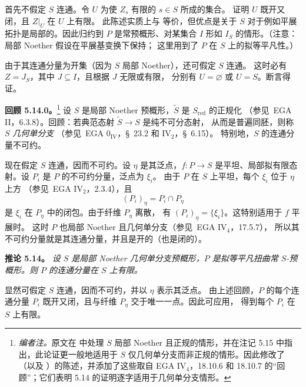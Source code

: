 首先不假定 \(S\) 连通。令 \(U\) 为使 \(Z_s\) 有限的 \(s\in S\) 所成的集合。
证明 \(U\) 既开又闭，且 \(Z|_U\) 在 \(U\) 上有限。
此陈述实质上与  等价，但优点是关于
\(S\) 对于例如平展拓扑是局部的。因此归约到 \(P\) 是常预概形、对某集合
\(I\) 形如 \(I_S\) 的情形。（注意：局部 Noether 假设在平展基变换下保持；
这里用到了 \(P\) 在 \(S\) 上的拟等平凡性。）

由于其连通分量为开集（因为 \(S\) 局部 Noether），还可假定 \(S\) 连通。
这时必有 \(Z=J_S\)，其中 \(J\subseteq I\)，且根据 \(J\) 无限或有限，
分别有 \(U=\varnothing\) 或 \(U=S\)。断言得证。

\par\medskip\noindent
\textbf{回顾 5.14.0。}\footnote{\textit{编者注。}原文在  中处理
\(S\) 局部 Noether 且正规的情形，并在注记 5.15 中指出，此论证更一般地适用于
\(S\) 仅几何单分支而非正规的情形。因此修改了 
（以及 ）的陈述，并添加了这些取自
EGA IV\(_4\)，18.10.6 和 18.10.7 的“回顾”；它们表明 5.14 的证明逐字适用于几何单分支情形。}\enspace
设 \(S\) 是局部 Noether 预概形，\(\widetilde S\) 是 \(S_{\mathrm{red}}\) 的正规化
（参见\ EGA II，6.3.8）。回顾：若典范态射 \(\widetilde S\to S\) 是纯不可分态射，
从而是普遍同胚，则称 \(S\) \emph{几何单分支}
（参见\ EGA \(0_{\mathrm{IV}}\)，\S~23.2 和 IV\(_2\)，\S~6.15）。
特别地，\(S\) 的连通分量不可约。

现在假定 \(S\) 连通，因而不可约。设 \(\eta\) 是其泛点，\(f:P\to S\)
是平坦、局部拟有限态射。设 \(P_i\) 是 \(P\) 的不可约分量，泛点为 \(\xi_i\)。
由于 \(P\) 在 \(S\) 上平坦，每个 \(\xi_i\) 位于 \(\eta\) 上方
（参见\ EGA IV\(_2\)，2.3.4），且
\[
  (P_i)_\eta=P_i\cap P_\eta
\]
是 \(\xi_i\) 在 \(P_\eta\) 中的闭包。由于纤维 \(P_\eta\) 离散，
有 \((P_i)_\eta=\{\xi_i\}\)。这特别适用于 \(f\) 平展时。
这时 \(P\) 也局部 Noether 且几何单分支（参见\ EGA IV\(_4\)，17.5.7），
所以其不可约分量就是其连通分量，并且是开的（也是闭的）。

\par\medskip\noindent
\textbf{推论 5.14。}\enspace
\emph{设 \(S\) 是局部 Noether 几何单分支预概形，\(P\) 是拟等平凡扭曲常
\(S\)-预概形。则 \(P\) 的连通分量在 \(S\) 上有限。}

显然可假定 \(S\) 连通，因而不可约，并以 \(\eta\) 表示其泛点。
由上述回顾，\(P\) 的每个连通分量 \(P_i\) 既开又闭，且与纤维 \(P_\eta\)
交于唯一一点。因此可应用，
得到每个 \(P_i\) 在 \(S\) 上有限。

